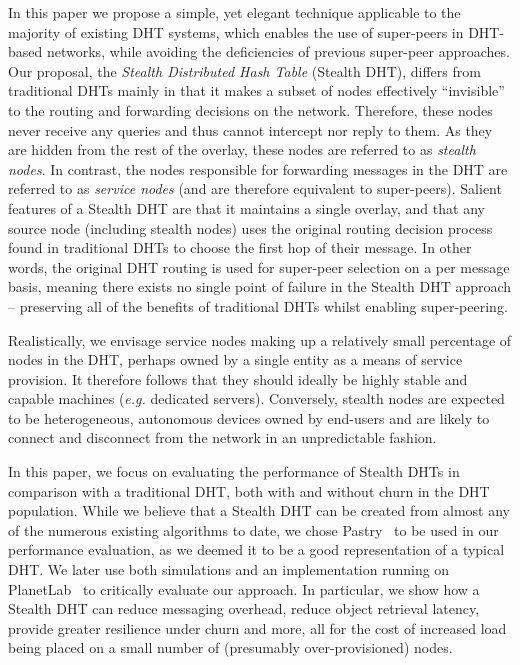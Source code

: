 \documentclass[letterpaper]{sig-alternate} %
\begin{document}
In this paper we propose a simple, yet elegant technique applicable
to the majority of existing DHT systems, which enables the use of
super-peers in DHT-based networks, while avoiding the deficiencies
of previous super-peer approaches. Our proposal, the \emph{Stealth
Distributed Hash Table} (Stealth DHT), differs from traditional DHTs
mainly in that it makes a subset of nodes effectively ``invisible''
to the routing and forwarding decisions on the network. Therefore,
these nodes never receive any queries and thus cannot intercept nor
reply to them. As they are hidden from the rest of the overlay,
these nodes are referred to as \emph{stealth nodes}. In contrast,
the nodes responsible for forwarding messages in the DHT are
referred to as \emph{service nodes} (and are therefore equivalent to
super-peers). Salient features of a Stealth DHT are that it
maintains a single overlay, and that any source node (including
stealth nodes) uses the original routing decision process found in
traditional DHTs to choose the first hop of their message.  In other
words, the original DHT routing is used for super-peer selection on
a per message basis, meaning there exists no single point of failure
in the Stealth DHT approach -- preserving all of the benefits of
traditional DHTs whilst enabling super-peering.

Realistically, we envisage service nodes making up a relatively small
percentage of nodes in the DHT, perhaps owned by a single entity as a means of
service provision. It therefore follows that they should ideally be highly
stable and capable machines (\emph{e.g.} dedicated servers). Conversely,
stealth nodes are expected to be heterogeneous, autonomous devices owned by
end-users and are likely to connect and disconnect from the network in an
unpredictable fashion.

In this paper, we focus on evaluating the performance of Stealth DHTs
in comparison with a traditional DHT, both with and without churn in
the DHT population. While we believe that a Stealth DHT can be created
from almost any of the numerous existing algorithms to date, we chose
Pastry~\cite{rowstron01pastry} to be used in our performance
evaluation, as we deemed it to be a good representation of a typical
DHT. We later use both simulations and an implementation running on
PlanetLab~\cite{planetlab} to critically evaluate our approach. In
particular, we show how a Stealth DHT can reduce messaging overhead,
reduce object retrieval latency, provide greater resilience under churn
and more, all for the cost of increased load being placed on a small
number of (presumably over-provisioned) nodes.
\end{document}
